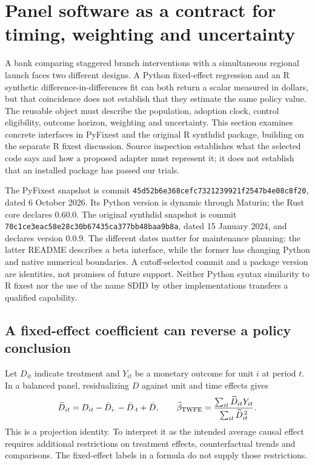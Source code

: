 \section{Panel software as a contract for timing, weighting and uncertainty}
\label{exec23:panel-scope}

A bank comparing staggered branch interventions with a simultaneous regional
launch faces two different designs. A Python fixed-effect regression and an R
synthetic difference-in-differences fit can both return a scalar measured in
dollars, but that coincidence does not establish that they estimate the same
policy value. The reusable object must describe the population, adoption clock,
control eligibility, outcome horizon, weighting and uncertainty. This section
examines concrete interfaces in PyFixest and the original R synthdid package,
building on the separate R fixest discussion. Source inspection establishes
what the selected code says and how a proposed adapter must represent it; it
does not establish that an installed package has passed our trials.
\citep{exec23_pyfixest_reuse_source,exec23_synthdid_reuse_source}

The PyFixest snapshot is commit
\texttt{45d52b6e368cefc7321239921f2547b4e08c8f20}, dated 6 October 2026.
Its Python version is dynamic through Maturin; the Rust core declares 0.60.0.
The original synthdid snapshot is commit
\texttt{70c1ce3eac58e28c30b67435ca377bb48baa9b8a}, dated 15 January 2024,
and declares version 0.0.9. The different dates matter for maintenance planning:
the latter README describes a beta interface, while the former has changing
Python and native numerical boundaries. A cutoff-selected commit and a package
version are identities, not promises of future support. Neither Python syntax
similarity to R fixest nor the use of the name SDID by other implementations
transfers a qualified capability.
\citep{exec23_pyfixest_reuse_source,exec23_synthdid_reuse_source}

\subsection{A fixed-effect coefficient can reverse a policy conclusion}
\label{exec23:panel-projection}
Let $D_{it}$ indicate treatment and $Y_{it}$ be a monetary outcome for unit $i$
at period $t$. In a balanced panel, residualizing $D$ against unit and time
effects gives
\begin{equation}
 \widetilde D_{it}=D_{it}-\bar D_{i\cdot}-\bar D_{\cdot t}+\bar D,
 \qquad
 \widehat\beta_{\rm TWFE}=
 \frac{\sum_{it}\widetilde D_{it}Y_{it}}
      {\sum_{it}\widetilde D_{it}^{\,2}}.
 \label{exec23:panel-twfe}
\end{equation}
This is a projection identity. To interpret it as the intended average causal
effect requires additional restrictions on treatment effects, counterfactual
trends and comparisons. The fixed-effect labels in a formula do not supply
those restrictions.


